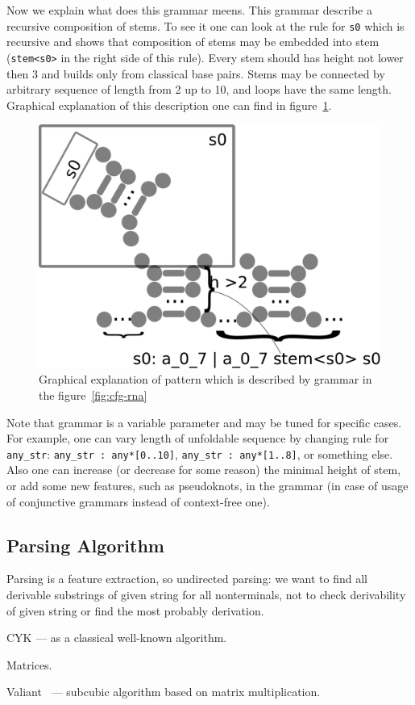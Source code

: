 \documentclass[a4paper,twoside]{article}
\begin{document}
Now we explain what does this grammar meens.
This grammar describe a recursive composition of stems.
To see it one can look at the rule for \verb|s0| which is recursive and shows that composition of stems may be embedded into stem (\verb |stem<s0>| in the right side of this rule).
Every stem should has height not lower then 3 and builds only from classical base pairs.
Stems may be connected by arbitrary sequence of length from 2 up to 10, and loops have the same length.
Graphical explanation of this description one can find in figure~\ref{fig:cfg-rna-graphical}.

\begin{figure}
\centering
\includegraphics[width=.5\textwidth]{figures/16sgrammar.pdf}
\caption{Graphical explanation of pattern which is described by grammar in the figure~\ref{fig:cfg-rna}}
\label{fig:cfg-rna-graphical}
\end{figure}

Note that grammar is a variable parameter and may be tuned for specific cases.
For example, one can vary length of unfoldable sequence by changing rule for \verb|any_str|: \verb|any_str : any*[0..10]|, \verb|any_str : any*[1..8]|, or something else.
Also one can increase (or decrease for some reason) the minimal height of stem, or add some new features, such as pseudoknots, in the grammar (in case of usage of conjunctive grammars instead of context-free one).


\subsection{Parsing Algorithm}

\noindent Parsing is a feature extraction, so undirected parsing: we want to find all derivable substrings of given string for all nonterminals, not to check derivability of given string or find the most probably derivation.

CYK --- as a classical well-known algorithm.

Matrices.

Valiant~\cite{Valiant:1975:GCR:1739932.1740048} --- subcubic algorithm based on matrix multiplication.
\end{document}
